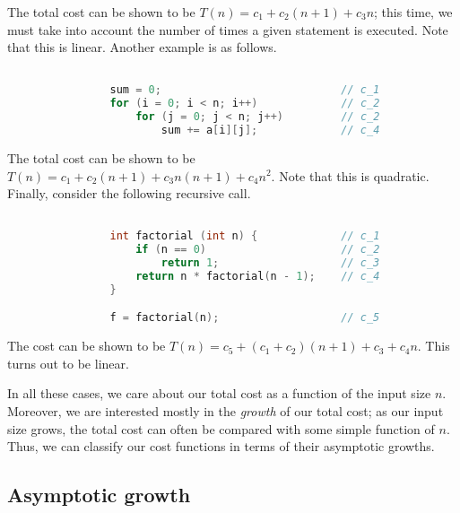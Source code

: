 \documentclass[11pt]{article}
\theoremstyle{definition}
\theoremstyle{remark}
\numberwithin{equation}{section}
\begin{document}
    The total cost can be shown to be $T(n) = c_1 + c_2(n + 1) + c_3n$; this time, we
    must take into account the number of times a given statement is executed. Note
    that this is linear. Another example is as follows.

    \begin{minipage}{\linewidth}  
    \begin{lstlisting}[language=C, numbers=none]

                sum = 0;                            // c_1
                for (i = 0; i < n; i++)             // c_2
                    for (j = 0; j < n; j++)         // c_2
                        sum += a[i][j];             // c_4
    \end{lstlisting}
    \end{minipage}

    The total cost can be shown to be $T(n) = c_1 + c_2(n + 1) + c_3n(n + 1) +
    c_4n^2$. Note that this is quadratic. Finally, consider the following recursive call.

    \begin{minipage}{\linewidth}  
    \begin{lstlisting}[language=C, numbers=none]

                int factorial (int n) {             // c_1
                    if (n == 0)                     // c_2
                        return 1;                   // c_3
                    return n * factorial(n - 1);    // c_4
                }

                f = factorial(n);                   // c_5
    \end{lstlisting}
    \end{minipage}
    The cost can be shown to be $T(n) = c_5 + (c_1 + c_2)(n + 1) + c_3 + c_4 n$. This
    turns out to be linear.

    In all these cases, we care about our total cost as a function of the input size
    $n$. Moreover, we are interested mostly in the \emph{growth} of our total cost;
    as our input size grows, the total cost can often be compared with some simple
    function of $n$. Thus, we can classify our cost functions in terms of their
    asymptotic growths.

    \subsection{Asymptotic growth}
\end{document}
